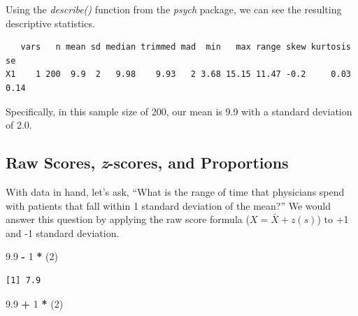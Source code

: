 \documentclass[
  11pt,
]{book}
\newenvironment{Shaded}{\begin{snugshade}}{\end{snugshade}}
\newcommand{\DecValTok}[1]{\textcolor[rgb]{0.06,0.06,0.06}{#1}}
\newcommand{\FloatTok}[1]{\textcolor[rgb]{0.06,0.06,0.06}{#1}}
\newcommand{\FunctionTok}[1]{\textcolor[rgb]{0.27,0.27,0.27}{\textbf{#1}}}
\newcommand{\NormalTok}[1]{#1}
\newcommand{\SpecialCharTok}[1]{\textcolor[rgb]{0.43,0.43,0.43}{\textbf{#1}}}
\begin{document}
Using the \emph{describe()} function from the \emph{psych} package, we can see the resulting descriptive statistics.

\begin{Shaded}
\end{Shaded}

\begin{verbatim}
   vars   n mean sd median trimmed mad  min   max range skew kurtosis   se
X1    1 200  9.9  2   9.98    9.93   2 3.68 15.15 11.47 -0.2     0.03 0.14
\end{verbatim}

Specifically, in this sample size of 200, our mean is 9.9 with a standard deviation of 2.0.

\hypertarget{raw-scores-z-scores-and-proportions}{%
\subsection{\texorpdfstring{Raw Scores, \emph{z}-scores, and Proportions}{Raw Scores, z-scores, and Proportions}}\label{raw-scores-z-scores-and-proportions}}

With data in hand, let's ask, ``What is the range of time that physicians spend with patients that fall within 1 standard deviation of the mean?'' We would answer this question by applying the raw score formula (\(X = \bar{X} + z(s)\)) to +1 and -1 standard deviation.

\begin{Shaded}
\begin{Highlighting}[]
\FloatTok{9.9} \SpecialCharTok{{-}} \DecValTok{1} \SpecialCharTok{*}\NormalTok{ (}\DecValTok{2}\NormalTok{)}
\end{Highlighting}
\end{Shaded}

\begin{verbatim}
[1] 7.9
\end{verbatim}

\begin{Shaded}
\begin{Highlighting}[]
\FloatTok{9.9} \SpecialCharTok{+} \DecValTok{1} \SpecialCharTok{*}\NormalTok{ (}\DecValTok{2}\NormalTok{)}
\end{Highlighting}
\end{Shaded}
\end{document}
